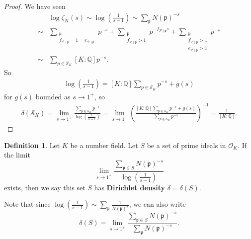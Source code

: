 \documentclass{article}
\theoremstyle{definition}
\newtheorem{defn}[theorem]{Definition}
\begin{document}
\begin{proof}
    We have seen 
    \begin{align*}
        &\log \zeta_K(s) \sim \log \left(\frac{1}{s-1}\right) \sim \sum_{\mathfrak{p}}^{} N(\mathfrak{p})^{-s} \\
        \sim& \sum_{\substack{\mathfrak{p}\\ f_{\mathcal{P}\mid \mathfrak{p}} = 1 = e_{\mathcal{P}\mid \mathfrak{p}}}}^{} p^{-s} + \sum_{\substack{\mathfrak{p} \\ f_{\mathcal{P}\mid \mathfrak{p}}>1}}^{} p^{-f_{\mathcal{P}\mid \mathfrak{p}}s} + \sum_{\substack{\mathfrak{p}\\ f_{\mathcal{P}\mid \mathfrak{p}}>1 \\e_{\mathcal{P}\mid \mathfrak{p}}>1}}^{} p^{-s} \\
        \sim& \sum_{p \in \mathcal{S}_K}^{} [K:\mathbb{Q}]p^{-s}.
    \end{align*}
    So 
    \begin{align*}
        \log \left(\frac{1}{s-1}\right) = [K:\mathbb{Q}]\sum_{p \in \mathcal{S}_K}^{} p^{-s} + g(s)
    \end{align*}
    for $g(s)$ bounded as $s \to 1^+$, so 
    \begin{align*}
        \delta(\mathcal{S}_K) = \lim_{s \to 1^+} \frac{\sum_{p \in \mathcal{S}_K}^{} p^{-s}}{\log \left(\frac{1}{s-1}\right)} = \lim_{s \to 1^+} \left(\frac{[K:\mathbb{Q}]\sum_{p \in \mathcal{S}_K}^{} p^{-s} + g(s)}{\sum_{p \in \mathcal{S}_K}^{} p^{-s}}\right)^{-1} = \frac{1}{[K:\mathbb{Q}]}.   
    \end{align*}
\end{proof}
\begin{defn}\label{defn3.2}
    Let $K$ be a number field. Let $S$ be a set of prime ideals in $\mathcal{O}_K$. If the limit \[
    \lim_{s \to 1^+} \frac{\sum_{\mathfrak{p} \in S}^{} N(\mathfrak{p})^{-s}}{\log \left(\frac{1}{s-1}\right)}
    \]
    exists, then we say this set $S$ has \textbf{Dirichlet density} $\delta = \delta(S)$.
\end{defn}
Note that since $\log \left(\frac{1}{s-1}\right) \sim \sum_{\mathfrak{p}}^{} \frac{1}{N(\mathfrak{p})^s}$, we can also write 
\[
\delta(S) = \lim_{s \to 1^+} \frac{\sum_{\mathfrak{p} \in S}^{} N(\mathfrak{p}) ^{-s}}{\sum_{\mathfrak{p}}^{} N(\mathfrak{p})^{-s}}.
\]
\end{document}
